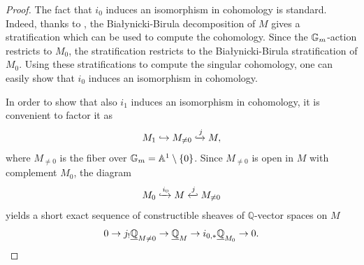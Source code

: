 \begin{proof}
The fact that $i_0$ induces an isomorphism in cohomology is standard. Indeed, thanks to \cite[Eq. 1.2.2]{Hausel-RodriguezVillega}, the Bia\l{y}nicki-Birula decomposition of $M$ gives a stratification which can be used to compute the cohomology. Since the $\mathbb{G}_m$-action restricts to $M_0$, the stratification restricts to the Bia\l{y}nicki-Birula stratification of $M_0$. Using these stratifications to compute the singular cohomology, one can easily show that $i_0$ induces an isomorphism in cohomology.

In order to show that also $i_1$ induces an isomorphism in cohomology, it is convenient to factor it as
\begin{equation}
M_1 \hookrightarrow M_{\neq 0} \xhookrightarrow{j} M,
\end{equation}
where $M_{\neq 0}$ is the fiber over $\mathbb{G}_m = \mathbb{A}^1 \setminus \{0\}$.
Since $M_{\neq 0}$ is open in $M$ with complement $M_0$, the diagram
\begin{equation}
M_0 \xhookrightarrow{i_0} M \xhookleftarrow{j} M_{\neq 0}
\end{equation}
yields a short exact sequence of constructible sheaves of $\mathbb{Q}$-vector spaces on $M$
\begin{equation} \label{Gysin sequence}
0 \to j_! \underline{\mathbb{Q}}_{M \neq 0} \to \underline{\mathbb{Q}}_M \to i_{0,*}\underline{\mathbb{Q}}_{M_0} \to 0.
\end{equation}


\end{proof}
